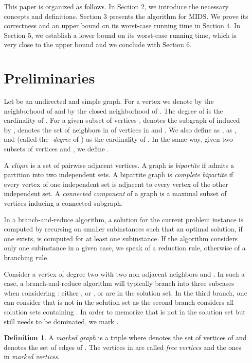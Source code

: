 \documentclass[a4paper,10pt]{article}
\theoremstyle{plain}
\theoremstyle{definition}
\newtheorem{definition}[theorem]{Definition}
\theoremstyle{remark}
\newcommand{\MIDSpb}{\textsc{MIDS}\xspace}
\begin{document}
\smallskip

This paper is organized as follows. In Section 2, we introduce the necessary concepts and definitions.
Section 3 presents the algorithm for \MIDSpb. We prove
its correctness and an upper bound on its worst-case running time in Section 4.
In Section 5, we establish a lower bound on its worst-case running time, which is very close
to the upper bound
and we conclude with Section 6.


\section{Preliminaries}


Let  be an undirected and simple graph. For a vertex  we denote 
by  the neighborhood of  and by  the closed neighborhood of .
The degree  of  is the cardinality of . For a given subset of vertices
,  denotes the subgraph of  induced by ,  denotes the set of
neighbors in  of vertices in  and . 
We also define  as ,  as , and  (called the -\emph{degree} of ) as the cardinality of
. In the same way, given two subsets of vertices  and , we define
.

A \emph{clique} is a set  of pairwise adjacent vertices.
A graph  is \emph{bipartite} if  admits a partition into two
independent sets.
A bipartite graph  is \emph{complete bipartite} if every vertex
of one independent set is adjacent to every vertex of the other independent set.
A \emph{connected component} of a graph is a maximal subset of vertices inducing a
connected subgraph.

\medskip

In a branch-and-reduce algorithm, a solution for the current problem instance is computed by
recursing on smaller subinstances such that
an optimal solution, if one exists, is computed for at least one subinstance.
If the algorithm considers only one subinstance in a given case, we speak of a reduction rule,
otherwise of a branching rule.

Consider a vertex  of degree two with two non adjacent neighbors  and .
In such a case, a branch-and-reduce algorithm will typically branch into three subcases when considering :
either , or , or  are in the solution set. In the third branch, one can consider that
 is not in the solution set as the second branch considers all solution sets containing . In order
to memorize that  is not in the solution set but still needs to be dominated, we mark .

\begin{definition}
A \emph{marked graph}  is a triple where 
 denotes the set of vertices of  and
 denotes the set of edges of .
The vertices in  are called \emph{free vertices} and the ones in 
\emph{marked vertices}.
\end{definition}
\end{document}
